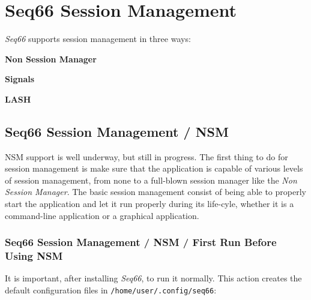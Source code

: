 %
%
%

\section{Seq66 Session Management}
\label{sec:sessions}

   \textsl{Seq66} supports session management in three ways:

   \begin{enumber}
      \item \textbf{Non Session Manager}
      \item \textbf{Signals}
      \item \textbf{LASH}
   \end{enumber}


\subsection{Seq66 Session Management / NSM}
\label{subsec:sessions_nsm}

   NSM support is well underway, but still in progress.
   The first thing to do for session management is make sure that the
   application is capable of various levels of session management, from none to
   a full-blown session manager like the \textsl{Non Session Manager}.  The
   basic session management consist of being able to properly start the
   application and let it run properly during its life-cyle, whether it is a
   command-line application or a graphical application.

\subsubsection{Seq66 Session Management / NSM / First Run Before Using NSM}
\label{subsec:sessions_nsm_before_using_nsm}

   It is important, after installing \textsl{Seq66}, to run it normally. This
   action creates the default configuration files in
   \texttt{/home/user/.config/seq66}:

